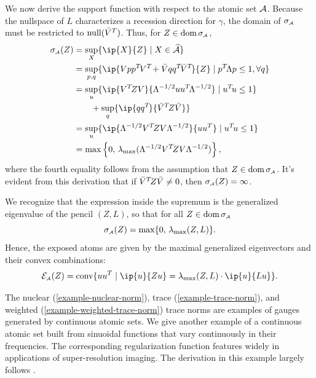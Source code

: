 \begin{example}
     We now derive the support function with respect to the atomic set $\mathcal{A}$.
     Because the nullspace of $L$ characterizes a recession direction for
     $\gamma$, the domain of $\sigma_{\scriptscriptstyle\mathcal{A}}$ must be restricted to $\Null(\Vbar^T)$.
     Thus, for $Z \in \operatorname{dom}\sigma_{\scriptscriptstyle\mathcal{A}}$, 
     \begin{align*}
       \sigma\As(Z)
         &= \sup_X\{\ip{X}{Z} \mid X\in\convA\}
       \\&= \sup_{p,q}\{\ip{Vpp\T V\T + \Vbar qq\T\Vbar\T}{Z} \mid p\T\Lambda p \le 1, \forall q\}
       \\&= \sup_{u}\{\ip{V\T Z V}{\Lambda^{-1/2}uu\T\Lambda^{-1/2}}\mid u\T u \le 1\}
       \\ &\qquad + \sup_q\{\ip{qq\T}{\Vbar\T Z\Vbar}\}
       \\&= \sup_u\{\ip{\Lambda^{-1/2}V\T Z V\Lambda^{-1/2}}{uu^T}\mid u\T u \le 1\} 
       \\&= \max\left\{ 0,\, \lambda\submax(\Lambda^{-1/2}V\T Z V\Lambda^{-1/2})\right\},
     \end{align*}
     where the fourth equality follows from the assumption that $Z \in
     \operatorname{dom}\sigma_{\scriptscriptstyle\mathcal{A}}$. It's evident from this derivation that if $\Vbar\T Z\Vbar
     \neq 0$, then $\sigma_{\scriptscriptstyle\mathcal{A}}(Z) = \infty$.
     
     We recognize that the expression inside the supremum is the generalized
     eigenvalue of the pencil $(Z,L)$, so that for all $Z \in \operatorname{dom}\sigma_{\scriptscriptstyle\mathcal{A}}$
     \[
       \sigma_{\scriptscriptstyle\mathcal{A}}(Z) = \max\{ 0,\, \lambda_{\max}(Z,L) \}.
     \]
     Hence, the exposed atoms are given by the maximal generalized
     eigenvectors and their convex combinations:
     \[
       \Escr\As(Z) = \conv\{uu^T \mid \ip{u}{Z u} = \lambda\submax(Z,L)\cdot \ip{u}{Lu}\}.
     \]
  \end{example}

  The nuclear (\autoref{example-nuclear-norm}), trace (\autoref{example-trace-norm}),
and weighted (\autoref{example-weighted-trace-norm}) trace norms are examples of
gauges generated by continuous atomic sets. We give another example of a
continuous atomic set built from sinuoidal functions that vary continuously in
their frequencies. The corresponding regularization function features widely in
applications of super-resolution imaging. The derivation in this example largely
follows \citet{chi2020harnessing}.

